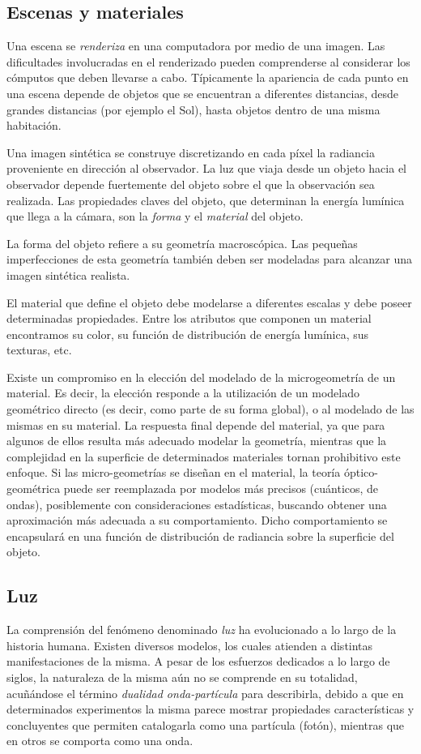 \subsection{Escenas y materiales}
Una escena se {\em renderiza} en una computadora por medio de una imagen.
Las dificultades involucradas en el renderizado pueden comprenderse al considerar los cómputos que deben llevarse a cabo.
Típicamente la apariencia de cada punto en una escena depende de objetos que se encuentran a diferentes distancias, desde grandes distancias (por ejemplo el Sol), hasta objetos dentro de una misma habitación.

Una imagen sintética se construye discretizando en cada píxel la radiancia proveniente en dirección al observador.
La luz que viaja desde un objeto hacia el observador depende fuertemente del objeto sobre el que la observación sea realizada.
Las propiedades claves del objeto, que determinan la energía lumínica que llega a la cámara, son la {\em forma} y el {\em material} del objeto.

La forma del objeto refiere a su geometría macroscópica.
Las pequeñas imperfecciones de esta geometría también deben ser modeladas para alcanzar una imagen sintética realista.

El material que define el objeto debe modelarse a diferentes escalas y debe poseer determinadas propiedades.
Entre los atributos que componen un material encontramos su color, su función de distribución de energía lumínica, sus texturas, etc.

Existe un compromiso en la elección del modelado de la microgeometría de un material.
Es decir, la elección responde a la utilización de un modelado geométrico directo (es decir, como parte de su forma global), o al modelado de las mismas en su material.
La respuesta final depende del material, ya que para algunos de ellos resulta más adecuado modelar la geometría, mientras que la complejidad en la superficie de determinados materiales tornan prohibitivo este enfoque.
Si las micro-geometrías se diseñan en el material, la teoría óptico-geométrica puede ser reemplazada por modelos más precisos (cuánticos, de ondas), posiblemente con consideraciones estadísticas, buscando obtener una aproximación más adecuada a su comportamiento.
Dicho comportamiento se encapsulará en una función de distribución de radiancia sobre la superficie del objeto.



\subsection{Luz}%
La comprensión del fenómeno denominado {\em luz} ha evolucionado a lo largo de la historia humana.
Existen diversos modelos, los cuales atienden a distintas manifestaciones de la misma.
A pesar de los esfuerzos dedicados a lo largo de siglos, la naturaleza de la misma aún no se comprende en su totalidad, acuñándose el término {\em dualidad onda-partícula} para describirla, debido a que en determinados experimentos la misma parece mostrar propiedades características y concluyentes que permiten catalogarla como una partícula (fotón), mientras que en otros se comporta como una onda.

